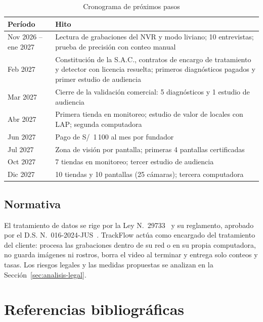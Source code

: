 \documentclass[12pt,a4paper]{article}
\begin{document}
\begin{table}[H]
\caption{Cronograma de próximos pasos}
\label{tab:cronograma}
\centering
\footnotesize
\renewcommand{\arraystretch}{1.12}
\begin{tabular}{|L{0.20\textwidth}|L{0.70\textwidth}|}
\hline
\textbf{Período} & \textbf{Hito} \\
\hline
Nov 2026 -- ene 2027 & Lectura de grabaciones del NVR y modo liviano; 10 entrevistas; prueba de precisión con conteo manual \\
\hline
Feb 2027 & Constitución de la S.A.C., contratos de encargo de tratamiento y detector con licencia resuelta; primeros diagnósticos pagados y primer estudio de audiencia \\
\hline
Mar 2027 & Cierre de la validación comercial: 5 diagnósticos y 1 estudio de audiencia \\
\hline
Abr 2027 & Primera tienda en monitoreo; estudio de valor de locales con LAP; segunda computadora \\
\hline
Jun 2027 & Pago de S/~1\,100 al mes por fundador \\
\hline
Jul 2027 & Zona de visión por pantalla; primeras 4 pantallas certificadas \\
\hline
Oct 2027 & 7 tiendas en monitoreo; tercer estudio de audiencia \\
\hline
Dic 2027 & 10 tiendas y 10 pantallas (25 cámaras); tercera computadora \\
\hline
\end{tabular}
\end{table}

\FloatBarrier
\subsection{Normativa}
\label{sec:normativa}

El tratamiento de datos se rige por la Ley N.\textdegree~29733~\cite{ley29733} y su reglamento,
aprobado por el D.S. N.\textdegree~016-2024-JUS~\cite{reglamento29733}. TrackFlow
actúa como encargado del tratamiento del cliente: procesa las grabaciones
dentro de su red o en su propia computadora, no guarda imágenes ni rostros,
borra el video al terminar y entrega solo conteos y tasas. Los riesgos legales
y las medidas propuestas se analizan en la Sección~\ref{sec:analisis-legal}.

\section*{Referencias bibliográficas}
\end{document}
